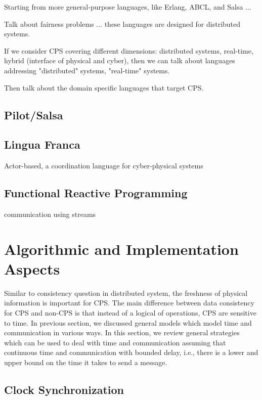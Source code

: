 \documentclass[
graybox,
envcountchap
]{svmult}
\begin{document}
\begin{bibunit}
Starting from more general-purpose languages, like Erlang, ABCL, and Salsa ...

Talk about fairness problems ... these languages are designed for distributed systems.

If we consider CPS covering different dimensions: distributed systems, real-time, hybrid (interface of physical and cyber), then we can talk about languages addressing "distributed" systems,  "real-time" systems.

Then talk about the domain specific languages that target CPS.


\subsection{Pilot/Salsa}

\subsection{Lingua Franca}
Actor-based, a coordination language for cyber-physical systems

\subsection{Functional Reactive Programming}

    communication using streams



\section{Algorithmic and Implementation Aspects}
\label{sec:implementation}

    Similar to consistency question in distributed system, the freshness of physical information is important for CPS.
    The main difference between data consistency for CPS and non-CPS is that instead of a logical of operations, CPS are sensitive to time.
    In previous section, we discussed general models which model time and communication in various ways.
    In this section, we review general strategies which can be used to deal with time and communication assuming that continuous time and communication with bounded delay, i.e., there is a lower and upper bound on the time it takes to send a message.

    \subsection{Clock Synchronization}
    

\end{bibunit}
\end{document}
